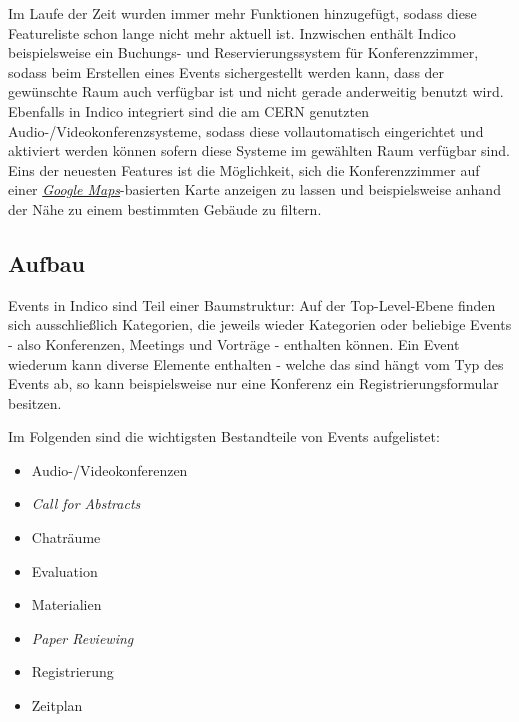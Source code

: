 Im Laufe der Zeit wurden immer mehr Funktionen hinzugefügt, sodass diese Featureliste schon lange
nicht mehr aktuell ist. Inzwischen enthält Indico beispielsweise ein Buchungs- und
Reservierungssystem für Konferenzzimmer, sodass beim Erstellen eines Events sichergestellt werden
kann, dass der gewünschte Raum auch verfügbar ist und nicht gerade anderweitig benutzt wird.
Ebenfalls in Indico integriert sind die am CERN genutzten Audio-/Videokonferenzsysteme, sodass diese
vollautomatisch eingerichtet und aktiviert werden können sofern diese Systeme im gewählten Raum
verfügbar sind. Eins der neuesten Features ist die Möglichkeit, sich die Konferenzzimmer auf einer
\href{http://maps.google.com/}{\emph{Google Maps}}-basierten Karte anzeigen zu lassen und
beispielsweise anhand der Nähe zu einem bestimmten Gebäude zu filtern.

\subsection{Aufbau}
Events in Indico sind Teil einer Baumstruktur: Auf der Top-Level-Ebene finden sich ausschließlich
Kategorien, die jeweils wieder Kategorien oder beliebige Events - also Konferenzen, Meetings und
Vorträge - enthalten können. Ein Event wiederum kann diverse Elemente enthalten - welche das sind
hängt vom Typ des Events ab, so kann beispielsweise nur eine Konferenz ein Registrierungsformular
besitzen.

Im Folgenden sind die wichtigsten Bestandteile von Events aufgelistet:

\begin{itemize}
\item Audio-/Videokonferenzen
\item \emph{Call for Abstracts}
\item Chaträume
\item Evaluation
\item Materialien
\item \emph{Paper Reviewing}
\item Registrierung
\item Zeitplan
\end{itemize}

